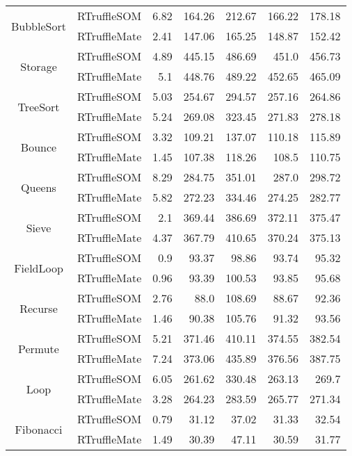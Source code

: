 \begin{center}
\begin{tabular}{ c | l r r r r r}
\multirow{2}{*}{ BubbleSort } & RTruffleSOM & 6.82 & 164.26 & 212.67 & 166.22 & 178.18 \\
& RTruffleMate & 2.41 & 147.06 & 165.25 & 148.87 & 152.42 \\
\midrule

\multirow{2}{*}{ Storage } & RTruffleSOM & 4.89 & 445.15 & 486.69 & 451.0 & 456.73 \\
& RTruffleMate & 5.1 & 448.76 & 489.22 & 452.65 & 465.09 \\
\midrule

\multirow{2}{*}{ TreeSort } & RTruffleSOM & 5.03 & 254.67 & 294.57 & 257.16 & 264.86 \\
& RTruffleMate & 5.24 & 269.08 & 323.45 & 271.83 & 278.18 \\
\midrule

\multirow{2}{*}{ Bounce } & RTruffleSOM & 3.32 & 109.21 & 137.07 & 110.18 & 115.89 \\
& RTruffleMate & 1.45 & 107.38 & 118.26 & 108.5 & 110.75 \\
\midrule

\multirow{2}{*}{ Queens } & RTruffleSOM & 8.29 & 284.75 & 351.01 & 287.0 & 298.72 \\
& RTruffleMate & 5.82 & 272.23 & 334.46 & 274.25 & 282.77 \\
\midrule

\multirow{2}{*}{ Sieve } & RTruffleSOM & 2.1 & 369.44 & 386.69 & 372.11 & 375.47 \\
& RTruffleMate & 4.37 & 367.79 & 410.65 & 370.24 & 375.13 \\
\midrule

\multirow{2}{*}{ FieldLoop } & RTruffleSOM & 0.9 & 93.37 & 98.86 & 93.74 & 95.32 \\
& RTruffleMate & 0.96 & 93.39 & 100.53 & 93.85 & 95.68 \\
\midrule

\multirow{2}{*}{ Recurse } & RTruffleSOM & 2.76 & 88.0 & 108.69 & 88.67 & 92.36 \\
& RTruffleMate & 1.46 & 90.38 & 105.76 & 91.32 & 93.56 \\
\midrule

\multirow{2}{*}{ Permute } & RTruffleSOM & 5.21 & 371.46 & 410.11 & 374.55 & 382.54 \\
& RTruffleMate & 7.24 & 373.06 & 435.89 & 376.56 & 387.75 \\
\midrule

\multirow{2}{*}{ Loop } & RTruffleSOM & 6.05 & 261.62 & 330.48 & 263.13 & 269.7 \\
& RTruffleMate & 3.28 & 264.23 & 283.59 & 265.77 & 271.34 \\
\midrule

\multirow{2}{*}{ Fibonacci } & RTruffleSOM & 0.79 & 31.12 & 37.02 & 31.33 & 32.54 \\
& RTruffleMate & 1.49 & 30.39 & 47.11 & 30.59 & 31.77 \\
\midrule

\end{tabular}
\end{center}